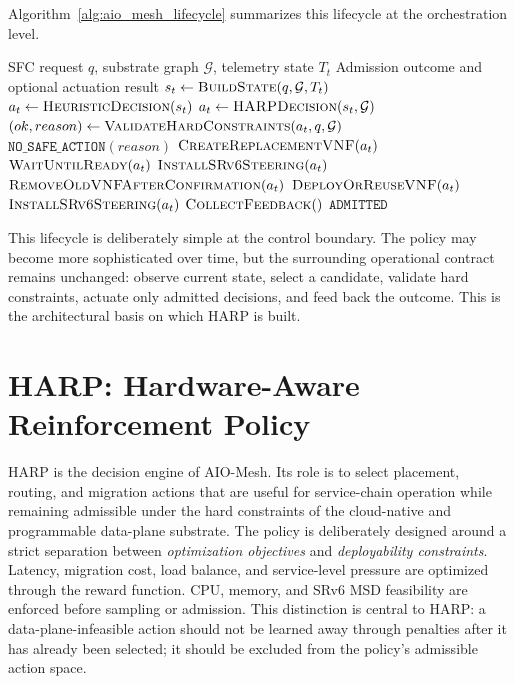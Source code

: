 \documentclass[final,5p]{elsarticle}
\begin{document}
Algorithm~\ref{alg:aio_mesh_lifecycle} summarizes this lifecycle at the orchestration level.

\begin{algorithm}[t]
\caption{AIO-Mesh request lifecycle}
\label{alg:aio_mesh_lifecycle}
\begin{algorithmic}[1]
\Require SFC request \(q\), substrate graph \(\mathcal{G}\), telemetry state \(T_t\)
\Ensure Admission outcome and optional actuation result
\State \(s_t \gets \textsc{BuildState}(q,\mathcal{G},T_t)\)
    \State \(a_t \gets \textsc{HeuristicDecision}(s_t)\)
\Else
    \State \(a_t \gets \textsc{HARPDecision}(s_t,\mathcal{G})\)
\EndIf
\State \((ok, reason) \gets \textsc{ValidateHardConstraints}(a_t, q, \mathcal{G})\)
    \State \Return \(\texttt{NO\_SAFE\_ACTION}(reason)\)
\EndIf
{}
    \State \(\textsc{CreateReplacementVNF}(a_t)\)
    \State \(\textsc{WaitUntilReady}(a_t)\)
    \State \(\textsc{InstallSRv6Steering}(a_t)\)
    \State \(\textsc{RemoveOldVNFAfterConfirmation}(a_t)\)
\Else
    \State \(\textsc{DeployOrReuseVNF}(a_t)\)
    \State \(\textsc{InstallSRv6Steering}(a_t)\)
\EndIf
\State \(\textsc{CollectFeedback}()\)
\State \Return \(\texttt{ADMITTED}\)
\end{algorithmic}
\end{algorithm}

This lifecycle is deliberately simple at the control boundary. The policy may become more sophisticated over time, but the surrounding operational contract remains unchanged: observe current state, select a candidate, validate hard constraints, actuate only admitted decisions, and feed back the outcome. This is the architectural basis on which HARP is built.


\section{HARP: Hardware-Aware Reinforcement Policy}
\label{sec:harp}

HARP is the decision engine of AIO-Mesh. Its role is to select placement, routing, and migration actions that are useful for service-chain operation while remaining admissible under the hard constraints of the cloud-native and programmable data-plane substrate. The policy is deliberately designed around a strict separation between \textit{optimization objectives} and \textit{deployability constraints}. Latency, migration cost, load balance, and service-level pressure are optimized through the reward function. CPU, memory, and SRv6 MSD feasibility are enforced before sampling or admission. This distinction is central to HARP: a data-plane-infeasible action should not be learned away through penalties after it has already been selected; it should be excluded from the policy's admissible action space.
\end{document}

